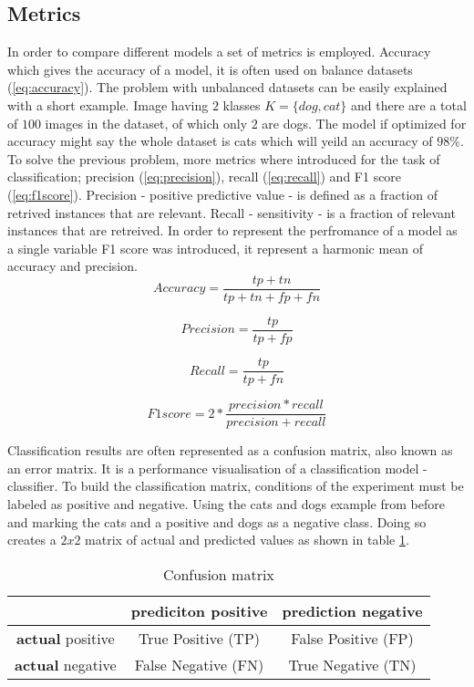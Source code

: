 \documentclass[times, utf8, diplomski]{fer}
\begin{document}
\subsection{Metrics}
In order to compare different models a set of metrics is employed. Accuracy which gives the accuracy of a model, it is often used on balance datasets (\ref{eq:accuracy}). The problem with unbalanced datasets can be easily explained with a short example. Image having $2$ klasses $K=\{dog,cat\}$ and there are a total of $100$ images in the dataset, of which only $2$ are dogs. The model if optimized for accuracy might say the whole dataset is cats which will yeild an accuracy of $98\%$. To solve the previous problem, more metrics where introduced for the task of classification; precision (\ref{eq:precision}), recall (\ref{eq:recall}) and F1 score (\ref{eq:f1score}). Precision - positive predictive value - is defined as a fraction of retrived instances that are relevant. Recall - sensitivity - is a fraction of relevant instances that are retreived. In order to represent the perfromance of a model as a single variable F1 score was introduced, it represent a harmonic mean of accuracy and precision.
\begin{equation} \label{eq:accuracy}
	Accuracy = \frac{tp + tn}{tp + tn + fp + fn}
\end{equation}

\begin{equation} \label{eq:precision}
	Precision = \frac{tp}{tp + fp}
\end{equation}

\begin{equation} \label{eq:recall}
	Recall = \frac{tp}{tp + fn}
\end{equation}

\begin{equation} \label{eq:f1score}
	F1 score = 2 * \frac{precision * recall}{precision + recall}
\end{equation}


Classification results are often represented as a confusion matrix, also known as an error matrix.  It is a performance visualisation of a classification model - classifier. To build the classification matrix, conditions of the experiment must be labeled as positive and negative. Using the cats and dogs example from before and marking the cats and a positive and dogs as a negative class. Doing so creates a $2x2$ matrix of actual and predicted values as shown in table \ref{tb:confusion_matrix}.

\begin{table}
\centering
\caption{Confusion matrix}
\label{tb:confusion_matrix}
\begin{tabular}{|c|c|c|}
\hline 
 & \textbf{prediciton} positive & \textbf{prediction} negative \\ 
\hline 
\textbf{actual} positive & True Positive (TP) & False Positive (FP) \\ 
\hline 
\textbf{actual} negative & False Negative (FN) & True Negative (TN) \\ 
\hline 
\end{tabular}
\end{table}
\end{document}
